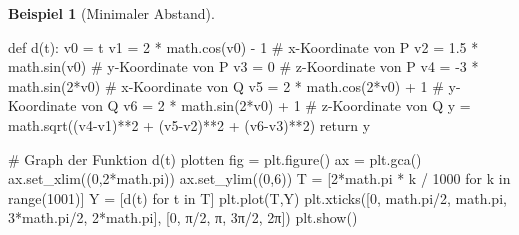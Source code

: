 \documentclass[
  a4paper,
  DIV=11]{scrreprt}
\newenvironment{Shaded}{\begin{snugshade}}{\end{snugshade}}
\newcommand{\BuiltInTok}[1]{\textcolor[rgb]{0.00,0.23,0.31}{#1}}
\newcommand{\CommentTok}[1]{\textcolor[rgb]{0.37,0.37,0.37}{#1}}
\newcommand{\ControlFlowTok}[1]{\textcolor[rgb]{0.00,0.23,0.31}{#1}}
\newcommand{\DecValTok}[1]{\textcolor[rgb]{0.68,0.00,0.00}{#1}}
\newcommand{\FloatTok}[1]{\textcolor[rgb]{0.68,0.00,0.00}{#1}}
\newcommand{\KeywordTok}[1]{\textcolor[rgb]{0.00,0.23,0.31}{#1}}
\newcommand{\NormalTok}[1]{\textcolor[rgb]{0.00,0.23,0.31}{#1}}
\newcommand{\OperatorTok}[1]{\textcolor[rgb]{0.37,0.37,0.37}{#1}}
\newcommand{\StringTok}[1]{\textcolor[rgb]{0.13,0.47,0.30}{#1}}
\theoremstyle{definition}
\theoremstyle{definition}
\newtheorem{example}{Beispiel}[chapter]
\theoremstyle{remark}
\begin{document}
\begin{example}[Minimaler
Abstand]
\begin{Shaded}
\begin{Highlighting}[]
\KeywordTok{def}\NormalTok{ d(t):}
\NormalTok{    v0 }\OperatorTok{=}\NormalTok{ t}
\NormalTok{    v1 }\OperatorTok{=} \DecValTok{2} \OperatorTok{*}\NormalTok{ math.cos(v0) }\OperatorTok{{-}} \DecValTok{1}    \CommentTok{\# x{-}Koordinate von P}
\NormalTok{    v2 }\OperatorTok{=} \FloatTok{1.5} \OperatorTok{*}\NormalTok{ math.sin(v0)      }\CommentTok{\# y{-}Koordinate von P}
\NormalTok{    v3 }\OperatorTok{=} \DecValTok{0}                       \CommentTok{\# z{-}Koordinate von P}
\NormalTok{    v4 }\OperatorTok{=} \OperatorTok{{-}}\DecValTok{3} \OperatorTok{*}\NormalTok{ math.sin(}\DecValTok{2}\OperatorTok{*}\NormalTok{v0)     }\CommentTok{\# x{-}Koordinate von Q}
\NormalTok{    v5 }\OperatorTok{=} \DecValTok{2} \OperatorTok{*}\NormalTok{ math.cos(}\DecValTok{2}\OperatorTok{*}\NormalTok{v0) }\OperatorTok{+} \DecValTok{1}  \CommentTok{\# y{-}Koordinate von Q}
\NormalTok{    v6 }\OperatorTok{=} \DecValTok{2} \OperatorTok{*}\NormalTok{ math.sin(}\DecValTok{2}\OperatorTok{*}\NormalTok{v0) }\OperatorTok{+} \DecValTok{1}  \CommentTok{\# z{-}Koordinate von Q}
\NormalTok{    y }\OperatorTok{=}\NormalTok{ math.sqrt((v4}\OperatorTok{{-}}\NormalTok{v1)}\OperatorTok{**}\DecValTok{2} \OperatorTok{+}\NormalTok{ (v5}\OperatorTok{{-}}\NormalTok{v2)}\OperatorTok{**}\DecValTok{2} \OperatorTok{+}\NormalTok{ (v6}\OperatorTok{{-}}\NormalTok{v3)}\OperatorTok{**}\DecValTok{2}\NormalTok{)}
    \ControlFlowTok{return}\NormalTok{ y}

\CommentTok{\# Graph der Funktion d(t) plotten}
\NormalTok{fig }\OperatorTok{=}\NormalTok{ plt.figure()}
\NormalTok{ax }\OperatorTok{=}\NormalTok{ plt.gca()}
\NormalTok{ax.set\_xlim((}\DecValTok{0}\NormalTok{,}\DecValTok{2}\OperatorTok{*}\NormalTok{math.pi))}
\NormalTok{ax.set\_ylim((}\DecValTok{0}\NormalTok{,}\DecValTok{6}\NormalTok{))}
\NormalTok{T }\OperatorTok{=}\NormalTok{ [}\DecValTok{2}\OperatorTok{*}\NormalTok{math.pi }\OperatorTok{*}\NormalTok{ k }\OperatorTok{/} \DecValTok{1000} \ControlFlowTok{for}\NormalTok{ k }\KeywordTok{in} \BuiltInTok{range}\NormalTok{(}\DecValTok{1001}\NormalTok{)]}
\NormalTok{Y }\OperatorTok{=}\NormalTok{ [d(t) }\ControlFlowTok{for}\NormalTok{ t }\KeywordTok{in}\NormalTok{ T]}
\NormalTok{plt.plot(T,Y)}
\NormalTok{plt.xticks([}\DecValTok{0}\NormalTok{, math.pi}\OperatorTok{/}\DecValTok{2}\NormalTok{, math.pi, }\DecValTok{3}\OperatorTok{*}\NormalTok{math.pi}\OperatorTok{/}\DecValTok{2}\NormalTok{, }\DecValTok{2}\OperatorTok{*}\NormalTok{math.pi],}
\NormalTok{           [}\StringTok{\textquotesingle{}0\textquotesingle{}}\NormalTok{, }\StringTok{\textquotesingle{}π/2\textquotesingle{}}\NormalTok{, }\StringTok{\textquotesingle{}π\textquotesingle{}}\NormalTok{, }\StringTok{\textquotesingle{}3π/2\textquotesingle{}}\NormalTok{, }\StringTok{\textquotesingle{}2π\textquotesingle{}}\NormalTok{])}
\NormalTok{plt.show()  }
\end{Highlighting}
\end{Shaded}


\end{example}
\end{document}
